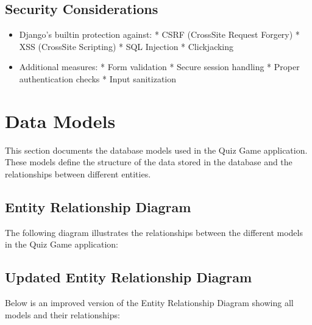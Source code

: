 \documentclass[letterpaper,10pt,english]{sphinxmanual}
\begin{document}
\subsection{Security Considerations}
\label{\detokenize{architecture:security-considerations}}\begin{itemize}
\item {} 
\sphinxAtStartPar
Django’s built\sphinxhyphen{}in protection against:
* CSRF (Cross\sphinxhyphen{}Site Request Forgery)
* XSS (Cross\sphinxhyphen{}Site Scripting)
* SQL Injection
* Clickjacking

\item {} 
\sphinxAtStartPar
Additional measures:
* Form validation
* Secure session handling
* Proper authentication checks
* Input sanitization

\end{itemize}

\sphinxstepscope


\section{Data Models}
\label{\detokenize{models:data-models}}\label{\detokenize{models::doc}}
\sphinxAtStartPar
This section documents the database models used in the Quiz Game application.
These models define the structure of the data stored in the database and the
relationships between different entities.


\subsection{Entity Relationship Diagram}
\label{\detokenize{models:entity-relationship-diagram}}
\sphinxAtStartPar
The following diagram illustrates the relationships between the different models in the Quiz Game application:



\subsection{Updated Entity Relationship Diagram}
\label{\detokenize{models:updated-entity-relationship-diagram}}
\sphinxAtStartPar
Below is an improved version of the Entity Relationship Diagram showing all models and their relationships:

\end{document}
